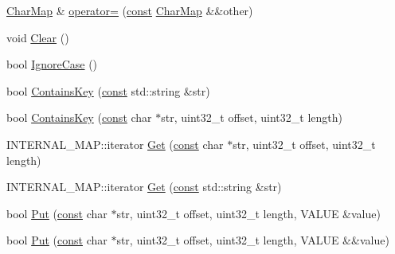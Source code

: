 \begin{DoxyCompactItemize}
\item 
\mbox{\hyperlink{classlucene_1_1core_1_1analysis_1_1characterutil_1_1CharMap}{Char\+Map}} \& \mbox{\hyperlink{classlucene_1_1core_1_1analysis_1_1characterutil_1_1CharMap_adef93a87f617af2b3f949b40ffd82cca}{operator=}} (\mbox{\hyperlink{ZlibCrc32_8h_a2c212835823e3c54a8ab6d95c652660e}{const}} \mbox{\hyperlink{classlucene_1_1core_1_1analysis_1_1characterutil_1_1CharMap}{Char\+Map}} \&\&other)
\item 
void \mbox{\hyperlink{classlucene_1_1core_1_1analysis_1_1characterutil_1_1CharMap_aa8eb8edcee9f2d66b238baba7ddae641}{Clear}} ()
\item 
bool \mbox{\hyperlink{classlucene_1_1core_1_1analysis_1_1characterutil_1_1CharMap_a3c99e09a343372fdf0bbadd782e841ce}{Ignore\+Case}} ()
\item 
bool \mbox{\hyperlink{classlucene_1_1core_1_1analysis_1_1characterutil_1_1CharMap_a3ddc016640b2f1328eb4ccb68d11cc62}{Contains\+Key}} (\mbox{\hyperlink{ZlibCrc32_8h_a2c212835823e3c54a8ab6d95c652660e}{const}} std\+::string \&str)
\item 
bool \mbox{\hyperlink{classlucene_1_1core_1_1analysis_1_1characterutil_1_1CharMap_a81b1167446c7c8988a523446436a313c}{Contains\+Key}} (\mbox{\hyperlink{ZlibCrc32_8h_a2c212835823e3c54a8ab6d95c652660e}{const}} char $\ast$str, uint32\+\_\+t offset, uint32\+\_\+t length)
\item 
I\+N\+T\+E\+R\+N\+A\+L\+\_\+\+M\+A\+P\+::iterator \mbox{\hyperlink{classlucene_1_1core_1_1analysis_1_1characterutil_1_1CharMap_a48f8b551ec74f77bfbf6e53649d7ce74}{Get}} (\mbox{\hyperlink{ZlibCrc32_8h_a2c212835823e3c54a8ab6d95c652660e}{const}} char $\ast$str, uint32\+\_\+t offset, uint32\+\_\+t length)
\item 
I\+N\+T\+E\+R\+N\+A\+L\+\_\+\+M\+A\+P\+::iterator \mbox{\hyperlink{classlucene_1_1core_1_1analysis_1_1characterutil_1_1CharMap_a753765dd29bb5f8c81ddb6b77d4cfa78}{Get}} (\mbox{\hyperlink{ZlibCrc32_8h_a2c212835823e3c54a8ab6d95c652660e}{const}} std\+::string \&str)
\item 
bool \mbox{\hyperlink{classlucene_1_1core_1_1analysis_1_1characterutil_1_1CharMap_a09382e34715068e50efa4b40a34a4ee5}{Put}} (\mbox{\hyperlink{ZlibCrc32_8h_a2c212835823e3c54a8ab6d95c652660e}{const}} char $\ast$str, uint32\+\_\+t offset, uint32\+\_\+t length, V\+A\+L\+UE \&value)
\item 
bool \mbox{\hyperlink{classlucene_1_1core_1_1analysis_1_1characterutil_1_1CharMap_a3d7b46fba00e762804ba1e953ac6587d}{Put}} (\mbox{\hyperlink{ZlibCrc32_8h_a2c212835823e3c54a8ab6d95c652660e}{const}} char $\ast$str, uint32\+\_\+t offset, uint32\+\_\+t length, V\+A\+L\+UE \&\&value)

\end{DoxyCompactItemize}
